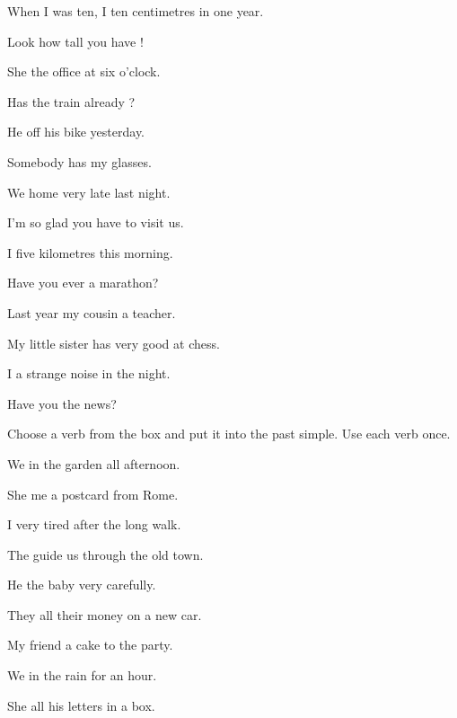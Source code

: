 \documentclass[11pt]{article}
\begin{document}
\begin{gapexercise}
  \item When I was ten, I  ten centimetres in one year.
  \item Look how tall you have !
  \item She  the office at six o'clock.
  \item Has the train already ?
  \item He  off his bike yesterday.
  \item Somebody has  my glasses.
  \item We  home very late last night.
  \item I'm so glad you have  to visit us.
  \item I  five kilometres this morning.
  \item Have you ever  a marathon?
  \item Last year my cousin  a teacher.
  \item My little sister has  very good at chess.
  \item I  a strange noise in the night.
  \item Have you  the news?
\end{gapexercise}

%
  {Choose a verb from the box and put it into the past simple.
   Use each verb once.}


\begin{gapexercise}
  \item We  in the garden all afternoon.
  \item She  me a postcard from Rome.
  \item I  very tired after the long walk.
  \item The guide  us through the old town.
  \item He  the baby very carefully.
  \item They  all their money on a new car.
  \item My friend  a cake to the party.
  \item We  in the rain for an hour.
  \item She  all his letters in a box.
\end{gapexercise}
\end{document}
